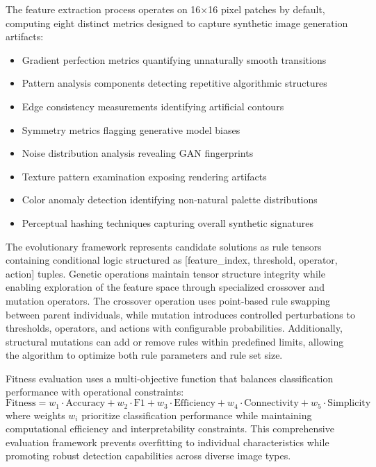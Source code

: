 \documentclass[runningheads]{llncs}
\begin{document}
The feature extraction process operates on 16×16 pixel patches by default, computing eight distinct metrics designed to capture synthetic image generation artifacts:
\begin{itemize}
    \item Gradient perfection metrics quantifying unnaturally smooth transitions
    \item Pattern analysis components detecting repetitive algorithmic structures
    \item Edge consistency measurements identifying artificial contours
    \item Symmetry metrics flagging generative model biases
    \item Noise distribution analysis revealing GAN fingerprints
    \item Texture pattern examination exposing rendering artifacts
    \item Color anomaly detection identifying non-natural palette distributions
    \item Perceptual hashing techniques capturing overall synthetic signatures
\end{itemize}

The evolutionary framework represents candidate solutions as rule tensors containing conditional logic structured as [feature\_index, threshold, operator, action] tuples. Genetic operations maintain tensor structure integrity while enabling exploration of the feature space through specialized crossover and mutation operators. The crossover operation uses point-based rule swapping between parent individuals, while mutation introduces controlled perturbations to thresholds, operators, and actions with configurable probabilities. Additionally, structural mutations can add or remove rules within predefined limits, allowing the algorithm to optimize both rule parameters and rule set size.

Fitness evaluation uses a multi-objective function that balances classification performance with operational constraints:
\begin{equation}
\text{Fitness} = w_1 \cdot \text{Accuracy} + w_2 \cdot \text{F1} + w_3 \cdot \text{Efficiency} + w_4 \cdot \text{Connectivity} + w_5 \cdot \text{Simplicity}
\end{equation}
where weights $w_i$ prioritize classification performance while maintaining computational efficiency and interpretability constraints. This comprehensive evaluation framework prevents overfitting to individual characteristics while promoting robust detection capabilities across diverse image types.
\end{document}
